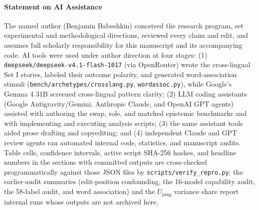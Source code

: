 \documentclass[conference]{IEEEtran}
\begin{document}
\paragraph*{Statement on AI Assistance}
The named author (Benjamin Babeshkin) conceived the research program, set experimental and methodological directions, reviewed every claim and edit, and assumes full scholarly responsibility for this manuscript and its accompanying code. AI tools were used under author direction at four stages: (1) \texttt{deepseek/deepseek-v4.1-flash-1017} (via OpenRouter) wrote the cross-lingual Set I stories, labeled their outcome polarity, and generated word-association stimuli (\texttt{bench/archetypes/crosslang.py}, \texttt{wordassoc.py}), while Google's Gemma 4 31B screened cross-lingual pattern clarity; (2) LLM coding assistants (Google Antigravity/Gemini, Anthropic Claude, and OpenAI GPT agents) assisted with authoring the swap, role, and matched epistemic benchmarks and with implementing and executing analysis scripts; (3) the same assistant tools aided prose drafting and copyediting; and (4) independent Claude and GPT review agents ran automated internal code, statistics, and manuscript audits. Table cells, confidence intervals, active script SHA-256 hashes, and headline numbers in the sections with committed outputs are cross-checked programmatically against those JSON files by \texttt{scripts/verify\_repro.py}; the earlier-audit summaries (edit-position confounding, the 16-model capability audit, the 58-label audit, and word association) and the $U_{\text{jung}}$ variance share report internal runs whose outputs are not archived here.
\end{document}
